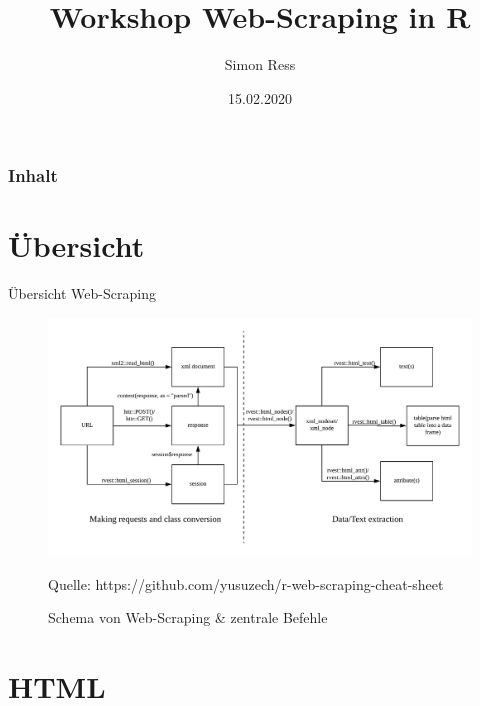 \documentclass[xcolor=dvipsnames]{beamer}\usepackage[]{graphicx}\usepackage[]{color}
\author{Simon Ress}
\institute{Ruhr-Universität Bochum}
\title{Workshop Web-Scraping in R}
\date{15.02.2020}
\begin{document}

\maketitle

\begin{frame}
\frametitle{Inhalt} 
\tableofcontents
\end{frame}



\section{Übersicht} %

\begin{frame}{Übersicht Web-Scraping}
  \begin{figure}
  	\centering
  	\caption{Schema von Web-Scraping \& zentrale Befehle}
  	\includegraphics[width=1\textwidth]{figure/overview-web-scraping.png}
  	{\footnotesize \tiny Quelle: https://github.com/yusuzech/r-web-scraping-cheat-sheet \par}
  \end{figure}
\end{frame}



\section{HTML} %
\end{document}
